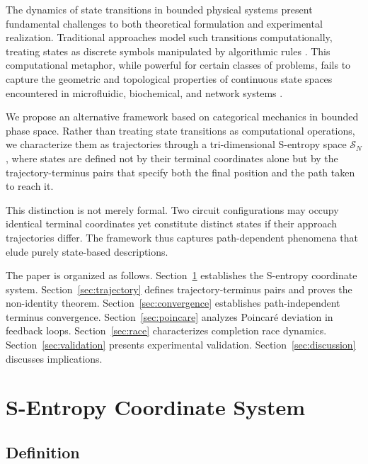 \documentclass[aps,prl,twocolumn,superscriptaddress,showpacs]{revtex4-2}
\newcommand{\Sspace}{\mathcal{S}}
\begin{document}
The dynamics of state transitions in bounded physical systems present fundamental challenges to both theoretical formulation and experimental realization. Traditional approaches model such transitions computationally, treating states as discrete symbols manipulated by algorithmic rules \cite{turing1936computable, church1936unsolvable}. This computational metaphor, while powerful for certain classes of problems, fails to capture the geometric and topological properties of continuous state spaces encountered in microfluidic, biochemical, and network systems \cite{stone2004engineering, whitesides2006origins}.

We propose an alternative framework based on categorical mechanics in bounded phase space. Rather than treating state transitions as computational operations, we characterize them as trajectories through a tri-dimensional S-entropy space $\Sspace_N$, where states are defined not by their terminal coordinates alone but by the trajectory-terminus pairs that specify both the final position and the path taken to reach it.

This distinction is not merely formal. Two circuit configurations may occupy identical terminal coordinates yet constitute distinct states if their approach trajectories differ. The framework thus captures path-dependent phenomena that elude purely state-based descriptions.

The paper is organized as follows. Section~\ref{sec:sentropy} establishes the S-entropy coordinate system. Section~\ref{sec:trajectory} defines trajectory-terminus pairs and proves the non-identity theorem. Section~\ref{sec:convergence} establishes path-independent terminus convergence. Section~\ref{sec:poincare} analyzes Poincar\'{e} deviation in feedback loops. Section~\ref{sec:race} characterizes completion race dynamics. Section~\ref{sec:validation} presents experimental validation. Section~\ref{sec:discussion} discusses implications.

\section{S-Entropy Coordinate System}
\label{sec:sentropy}

\subsection{Definition}
\end{document}
